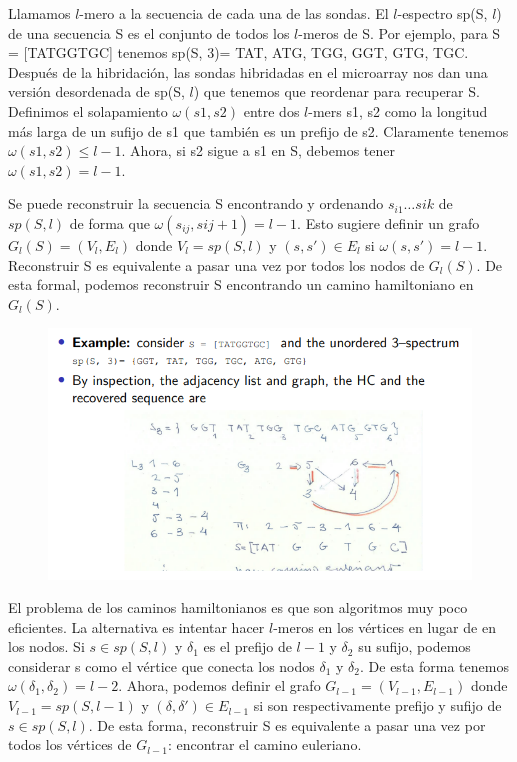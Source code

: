 Llamamos $l$-mero a la secuencia de cada una de las sondas. El $l$-espectro sp(S, $l$) de una secuencia S es el conjunto de todos los $l$-meros de S. Por ejemplo, para S = [TATGGTGC] tenemos sp(S, 3)= {TAT, ATG, TGG, GGT, GTG, TGC}. Después de la hibridación, las sondas hibridadas en el microarray nos dan una versión desordenada de sp(S, $l$) que tenemos que reordenar para recuperar S. Definimos el solapamiento $\omega(s1,s2)$ entre dos $l$-mers s1, s2 como la longitud más larga de un sufijo de s1 que también es un prefijo de s2. Claramente tenemos $\omega(s1,s2) \leq l - 1$. Ahora, si s2 sigue a s1 en S, debemos tener $\omega(s1,s2) = l - 1$.

Se puede reconstruir la secuencia S encontrando y ordenando $s_{i1} \ldots s{ik}$ de $sp(S, l)$ de forma que $\omega(s_{ij}, s{ij+1}) = l - 1$. Esto sugiere definir un grafo $G_l(S) = (V_l, E_l)$ donde $V_l = sp(S, l)$ y $(s, s') \in E_l$ si $\omega(s, s') = l - 1$.
Reconstruir S es equivalente a pasar una vez por todos los nodos de $G_l(S)$. De esta formal, podemos reconstruir S encontrando un camino hamiltoniano en $G_l(S)$.
\begin{figure}[h]
\centering
\includegraphics[width = \textwidth]{figs/hamiltonian-dna.png}
\end{figure}

El problema de los caminos hamiltonianos es que son algoritmos muy poco eficientes. La alternativa es intentar hacer $l$-meros en los vértices en lugar de en los nodos. Si $s \in sp(S, l)$ y $\delta_1$ es el prefijo de $l - 1$ y $\delta_2$ su sufijo, podemos considerar s como el vértice que conecta los nodos $\delta_1$ y $\delta_2$. De esta forma tenemos $\omega(\delta_1, \delta_2) = l - 2$. Ahora, podemos definir el grafo $G_{l-1} = (V_{l-1}, E_{l-1})$ donde $V_{l-1} = sp(S, l-1)$ y $(\delta, \delta') \in E_{l-1}$ si son respectivamente prefijo y sufijo de $s \in sp(S, l)$. De esta forma, reconstruir S es equivalente a pasar una vez por todos los vértices de $G_{l-1}$: encontrar el camino euleriano.

